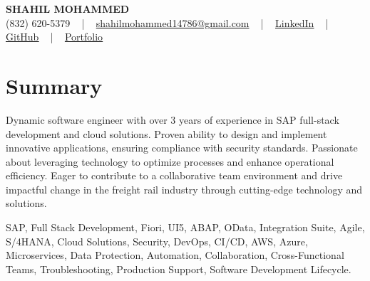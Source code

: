 \documentclass[letterpaper,10pt]{article}
\begin{document}
\begin{center}
    {\fontsize{14pt}{12pt}\selectfont \textbf{\MakeUppercase{Shahil Mohammed}}}\\ \vspace{2pt}
    \fontsize{10pt}{12pt}\selectfont (832) 620-5379 ~ | ~ \href{mailto:shahilmohammed14786@gmail.com}{shahilmohammed14786@gmail.com} ~ | ~  
    \href{https://www.linkedin.com/in/shahil-mohammed-9652931a1/}{\color{blue}\underline{LinkedIn}}  ~ | ~ 
    \href{https://github.com/freakbeast14}{\color{blue}\underline{GitHub}} ~ | ~ 
    \href{https://shahil-mohammed.netlify.app/}{\color{blue}\underline{Portfolio}}
    \vspace{-8pt}
\end{center}

\section{Summary}
\vspace{-2pt}\fontsize{8pt}{9pt}\selectfont
Dynamic software engineer with over 3 years of experience in SAP full-stack development and cloud solutions. Proven ability to design and implement innovative applications, ensuring compliance with security standards. Passionate about leveraging technology to optimize processes and enhance operational efficiency. Eager to contribute to a collaborative team environment and drive impactful change in the freight rail industry through cutting-edge technology and solutions.
 \vspace{-5pt}
 
{\fontsize{1pt}{1pt}\selectfont\color{white}
SAP, Full Stack Development, Fiori, UI5, ABAP, OData, Integration Suite, Agile, S/4HANA, Cloud Solutions, Security, DevOps, CI/CD, AWS, Azure, Microservices, Data Protection, Automation, Collaboration, Cross-Functional Teams, Troubleshooting, Production Support, Software Development Lifecycle.
}
\vspace{-8pt}

\vspace{-2pt}
\end{document}
